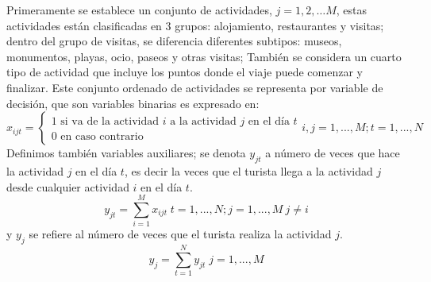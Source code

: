 Primeramente se establece un conjunto de actividades, $j=1, 2, … M$, estas actividades están clasificadas en 3 grupos: alojamiento, restaurantes y visitas; dentro del grupo de visitas, se diferencia diferentes subtipos: museos, monumentos, playas, ocio, paseos y otras visitas; También se considera un cuarto tipo de actividad que incluye los puntos donde el viaje puede comenzar y finalizar.
Este conjunto ordenado de actividades se representa por variable de decisión, que son variables binarias es expresado en:
\begin{equation}
    x_{ijt}= \begin{cases} \text{1 si va de la actividad $i$ a la actividad $j$ en el día $t$}\\ \text{0 en caso contrario} \end{cases} i,j=1,...,M; t=1,...,N
    \label{eq:e_1}
\end{equation}
Definimos también variables auxiliares; se denota $y_{jt}$ a número de veces que hace la actividad $j$ en el día $t$, es decir la veces que el turista llega a la actividad $j$ desde cualquier actividad $i$ en el día $t$.
\begin{equation}
    y_{jt}=\sum_{i=1}^{M}x_{ijt}\; t=1,...,N; j=1,...,M\: j\neq i
\end{equation}
y $y_{j}$ se refiere al número de veces que el turista realiza la actividad $j$.
\begin{equation}
    y_{j}=\sum_{t=1}^{N}y_{jt}\; j=1,...,M
\end{equation}

